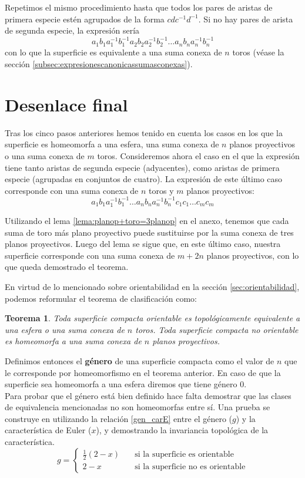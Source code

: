 \documentclass[a4paper,11pt,spanish, twoside, leqno]{tfg-uam}
\newtheorem*{teorsin}{Teorema}
\theoremstyle{definition}
\begin{document}
Repetimos el mismo procedimiento hasta que todos los pares de aristas de primera especie estén agrupados de la forma  $cdc^{-1}d^{-1}$. Si no hay pares de arista de segunda especie, la expresión sería 
\[a_1 b_1 a_1^{-1} b_1^{-1} a_2 b_2 a_2^{-1} b_2^{-1} \ldots a_n b_n a_n^{-1} b_n^{-1}\]
con lo que la superficie es equivalente a una suma conexa de $n$ toros (véase la sección \ref{subsec:expresionescanonicassumasconexas}).


\section{Desenlace final}

Tras los cinco pasos anteriores hemos tenido en cuenta los casos en los que la superficie es homeomorfa a una esfera, una suma conexa de $n$ planos proyectivos o una suma conexa de $m$ toros. Consideremos ahora el caso en el que la expresión tiene tanto aristas de segunda especie (adyacentes), como aristas de primera especie (agrupadas en conjuntos de cuatro). La expresión de este último caso corresponde con una suma conexa de $n$ toros y $m$ planos proyectivos:
\[ a_1 b_1 a_1^{-1} b_1^{-1} \ldots a_n b_n a_n^{-1} b_n^{-1} c_1 c_1 \ldots c_m c_m \] 

Utilizando el lema \ref{lema:planop+toro=3planop} en el anexo, tenemos que cada suma de toro más plano proyectivo puede sustituirse por la suma conexa de tres planos proyectivos. Luego del lema se sigue que, en este último caso, nuestra superficie corresponde con una suma conexa de $m+2n$ planos proyectivos, con lo que queda demostrado el teorema.

En virtud de lo mencionado sobre orientabilidad en la sección \ref{sec:orientabilidad}, podemos reformular el teorema de clasificación como:

\begin{teorsin}
Toda superficie compacta orientable es topológicamente equivalente a una esfera o una suma conexa de $n$ toros. Toda superficie compacta no orientable es homeomorfa a una suma conexa de $n$ planos proyectivos.
\end{teorsin}

Definimos entonces el \textbf{género} de una superficie compacta como el valor de $n$ que le corresponde por homeomorfismo en el teorema anterior. En caso de que la superficie sea homeomorfa a una esfera diremos que tiene género 0. \\
Para probar que el género está bien definido hace falta demostrar que las clases de equivalencia mencionadas no son homeomorfas entre sí. Una prueba se construye en \cite{massey} utilizando la relación \ref{gen_carE} entre el género ($g$) y la característica de Euler ($x$), y demostrando la invariancia topológica de la característica.
\begin{equation}
\label{gen_carE}
g = \begin{cases}
\frac{1}{2}(2-x) & \quad \text{si la superficie es orientable}\\
2-x & \quad \text{si la superficie no es orientable}
\end{cases}
\end{equation}
\end{document}
